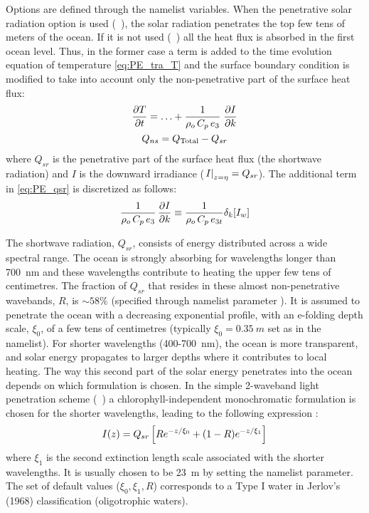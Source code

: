 \documentclass[../main/NEMO_manual]{subfiles}
\begin{document}
Options are defined through the  namelist variables.
When the penetrative solar radiation option is used (~),
the solar radiation penetrates the top few tens of meters of the ocean.
If it is not used (~) all the heat flux is absorbed in the first ocean level.
Thus, in the former case a term is added to the time evolution equation of temperature \autoref{eq:PE_tra_T} and
the surface boundary condition is modified to take into account only the non-penetrative part of the surface 
heat flux:
\begin{equation}
  \label{eq:PE_qsr}
  \begin{gathered}
    \pd[T]{t} = \ldots + \frac{1}{\rho_o \, C_p \, e_3} \; \pd[I]{k} \\
    Q_{ns} = Q_\text{Total} - Q_{sr}
  \end{gathered}
\end{equation}
where $Q_{sr}$ is the penetrative part of the surface heat flux (\ie the shortwave radiation) and
$I$ is the downward irradiance ($\left. I \right|_{z = \eta} = Q_{sr}$).
The additional term in \autoref{eq:PE_qsr} is discretized as follows:
\begin{equation}
  \label{eq:tra_qsr}
  \frac{1}{\rho_o \, C_p \, e_3} \, \pd[I]{k} \equiv \frac{1}{\rho_o \, C_p \, e_{3t}} \delta_k [I_w]
\end{equation}

The shortwave radiation, $Q_{sr}$, consists of energy distributed across a wide spectral range.
The ocean is strongly absorbing for wavelengths longer than 700~nm and these wavelengths contribute to
heating the upper few tens of centimetres.
The fraction of $Q_{sr}$ that resides in these almost non-penetrative wavebands, $R$, is $\sim 58\%$
(specified through namelist parameter ).
It is assumed to penetrate the ocean with a decreasing exponential profile, with an e-folding depth scale, $\xi_0$,
of a few tens of centimetres (typically $\xi_0 = 0.35~m$ set as  in the  namelist).
For shorter wavelengths (400-700~nm), the ocean is more transparent, and solar energy propagates to
larger depths where it contributes to local heating.
The way this second part of the solar energy penetrates into the ocean depends on which formulation is chosen.
In the simple 2-waveband light penetration scheme (~)
a chlorophyll-independent monochromatic formulation is chosen for the shorter wavelengths,
leading to the following expression \citep{Paulson1977}:
\[
  I(z) = Q_{sr} \left[ Re^{- z / \xi_0} + (1 - R) e^{- z / \xi_1} \right]
\]
where $\xi_1$ is the second extinction length scale associated with the shorter wavelengths.
It is usually chosen to be 23~m by setting the  namelist parameter.
The set of default values ($\xi_0, \xi_1, R$) corresponds to a Type I water in Jerlov's (1968) classification
(oligotrophic waters).
\end{document}
